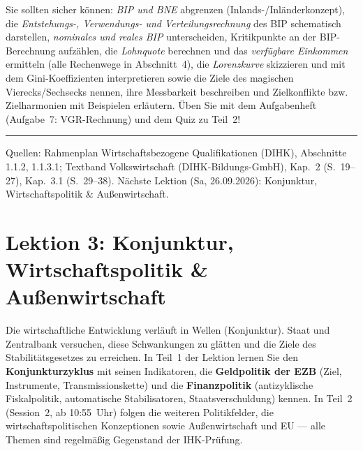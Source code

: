 \documentclass[11pt, a4paper]{article}
\begin{document}
\begin{merksatz}[title={\bfseries Wichtig für die Prüfungsvorbereitung (Teil 2)}]
Sie sollten sicher können: \emph{BIP und BNE} abgrenzen (Inlands-/Inländerkonzept), die
\emph{Entstehungs-, Verwendungs- und Verteilungsrechnung} des BIP schematisch darstellen,
\emph{nominales und reales BIP} unterscheiden, Kritikpunkte an der BIP-Berechnung
aufzählen, die \emph{Lohnquote} berechnen und das \emph{verfügbare Einkommen} ermitteln
(alle Rechenwege in Abschnitt~4), die \emph{Lorenzkurve} skizzieren und mit dem
Gini-Koeffizienten interpretieren sowie die Ziele des magischen Vierecks/Sechsecks
nennen, ihre Messbarkeit beschreiben und Zielkonflikte bzw. Zielharmonien mit Beispielen
erläutern. Üben Sie mit dem Aufgabenheft (Aufgabe~7: VGR-Rechnung) und dem Quiz zu Teil~2!
\end{merksatz}

\vspace{1em}
\hrule
\vspace{0.8em}
\noindent\textsf{\small Quellen: Rahmenplan Wirtschaftsbezogene Qualifikationen (DIHK), Abschnitte 1.1.2, 1.1.3.1;
Textband Volkswirtschaft (DIHK-Bildungs-GmbH), Kap.~2 (S.~19--27), Kap.~3.1 (S.~29--38).
Nächste Lektion (Sa, 26.09.2026): Konjunktur, Wirtschaftspolitik \& Außenwirtschaft.}
\clearpage
\section{Lektion 3: Konjunktur, Wirtschaftspolitik \& Außenwirtschaft}
\par{}\smallskip
\begin{merksatz}[title={\bfseries Worum geht es in diesem Teil?}]
Die wirtschaftliche Entwicklung verläuft in Wellen (Konjunktur). Staat und Zentralbank
versuchen, diese Schwankungen zu glätten und die Ziele des Stabilitätsgesetzes zu erreichen.
In Teil~1 der Lektion lernen Sie den \textbf{Konjunkturzyklus} mit seinen Indikatoren, die
\textbf{Geldpolitik der EZB} (Ziel, Instrumente, Transmissionskette) und die
\textbf{Finanzpolitik} (antizyklische Fiskalpolitik, automatische Stabilisatoren,
Staatsverschuldung) kennen. In Teil~2 (Session~2, ab 10:55~Uhr) folgen die weiteren
Politikfelder, die wirtschaftspolitischen Konzeptionen sowie Außenwirtschaft und EU ---
alle Themen sind regelmäßig Gegenstand der IHK-Prüfung.
\end{merksatz}
\end{document}
